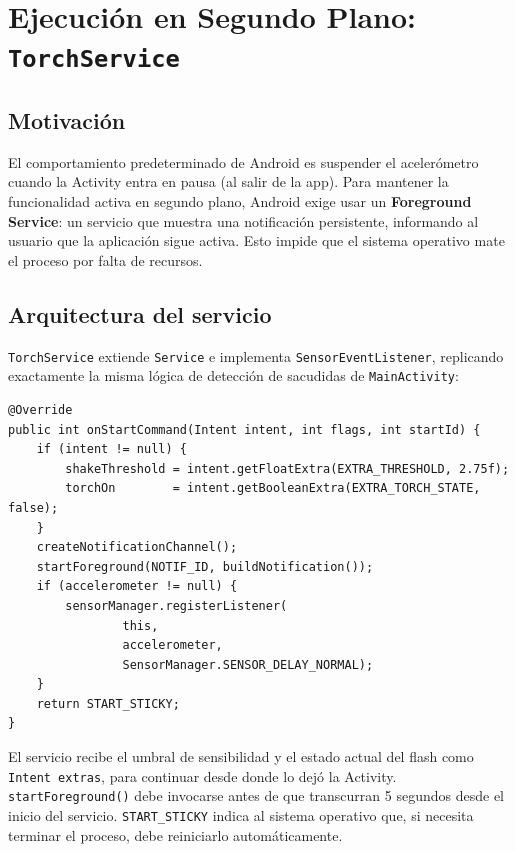 \documentclass[12pt, a4paper]{article}
\begin{document}
\section{Ejecuci\'on en Segundo Plano: \texttt{TorchService}}

\subsection{Motivaci\'on}

El comportamiento predeterminado de Android es suspender el aceler\'ometro
cuando la Activity entra en pausa (al salir de la app). Para mantener la
funcionalidad activa en segundo plano, Android exige usar un
\textbf{Foreground Service}: un servicio que muestra una notificaci\'on
persistente, informando al usuario que la aplicaci\'on sigue activa. Esto
impide que el sistema operativo mate el proceso por falta de recursos.

\subsection{Arquitectura del servicio}

\texttt{TorchService} extiende \texttt{Service} e implementa
\texttt{SensorEventListener}, replicando exactamente la misma l\'ogica de
detecci\'on de sacudidas de \texttt{MainActivity}:

\begin{lstlisting}[caption={Arranque del servicio --- \texttt{TorchService.java}}]
@Override
public int onStartCommand(Intent intent, int flags, int startId) {
    if (intent != null) {
        shakeThreshold = intent.getFloatExtra(EXTRA_THRESHOLD, 2.75f);
        torchOn        = intent.getBooleanExtra(EXTRA_TORCH_STATE, false);
    }
    createNotificationChannel();
    startForeground(NOTIF_ID, buildNotification());
    if (accelerometer != null) {
        sensorManager.registerListener(
                this,
                accelerometer,
                SensorManager.SENSOR_DELAY_NORMAL);
    }
    return START_STICKY;
}
\end{lstlisting}

El servicio recibe el umbral de sensibilidad y el estado actual del flash como
\texttt{Intent extras}, para continuar desde donde lo dej\'o la Activity.
\texttt{startForeground()} debe invocarse antes de que transcurran 5 segundos
desde el inicio del servicio. \texttt{START\_STICKY} indica al sistema operativo
que, si necesita terminar el proceso, debe reiniciarlo autom\'aticamente.
\end{document}
